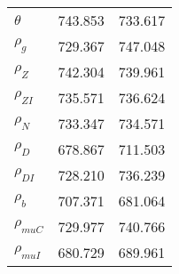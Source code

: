 \begin{center}
\begin{longtable}{lcc}
$ {\theta}             $	 & 	     743.853	 & 	     733.617 \\ 
$ {\rho_g}             $	 & 	     729.367	 & 	     747.048 \\ 
$ {\rho_Z}             $	 & 	     742.304	 & 	     739.961 \\ 
$ {\rho_{ZI}}          $	 & 	     735.571	 & 	     736.624 \\ 
$ {\rho_N}             $	 & 	     733.347	 & 	     734.571 \\ 
$ {\rho_D}             $	 & 	     678.867	 & 	     711.503 \\ 
$ {\rho_{DI}}          $	 & 	     728.210	 & 	     736.239 \\ 
$ {\rho_b}             $	 & 	     707.371	 & 	     681.064 \\ 
$ {\rho_{muC}}         $	 & 	     729.977	 & 	     740.766 \\ 
$ {\rho_{muI}}         $	 & 	     680.729	 & 	     689.961 \\ 
\end{longtable}
 \end{center}
